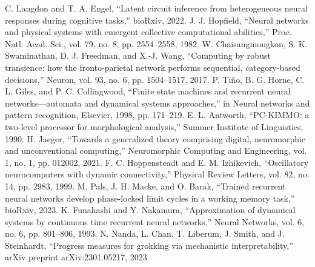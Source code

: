 \documentclass[conference]{IEEEtran}
\begin{document}
\begin{thebibliography}{00}
 C. Langdon and T. A. Engel, ``Latent circuit inference from heterogeneous neural responses during cognitive tasks,'' bioRxiv, 2022.
 J. J. Hopfield, ``Neural networks and physical systems with emergent collective computational abilities,'' Proc. Natl. Acad. Sci., vol. 79, no. 8, pp. 2554--2558, 1982.
 W. Chaisangmongkon, S. K. Swaminathan, D. J. Freedman, and X.-J. Wang, ``Computing by robust transience: how the fronto-parietal network performs sequential, category-based decisions,'' Neuron, vol. 93, no. 6, pp. 1504--1517, 2017.
 P. Ti\v{n}o, B. G. Horne, C. L. Giles, and P. C. Collingwood, ``Finite state machines and recurrent neural networks—automata and dynamical systems approaches,'' in Neural networks and pattern recognition, Elsevier, 1998, pp. 171--219.
 E. L. Antworth, ``PC-KIMMO: a two-level processor for morphological analysis,'' Summer Institute of Linguistics, 1990.
 H. Jaeger, ``Towards a generalized theory comprising digital, neuromorphic and unconventional computing,'' Neuromorphic Computing and Engineering, vol. 1, no. 1, pp. 012002, 2021.
 F. C. Hoppensteadt and E. M. Izhikevich, ``Oscillatory neurocomputers with dynamic connectivity,'' Physical Review Letters, vol. 82, no. 14, pp. 2983, 1999.
 M. Pals, J. H. Macke, and O. Barak, ``Trained recurrent neural networks develop phase-locked limit cycles in a working memory task,'' bioRxiv, 2023.
 K. Funahashi and Y. Nakamura, ``Approximation of dynamical systems by continuous time recurrent neural networks,'' Neural Networks, vol. 6, no. 6, pp. 801--806, 1993.
 N. Nanda, L. Chan, T. Liberum, J. Smith, and J. Steinhardt, ``Progress measures for grokking via mechanistic interpretability,'' arXiv preprint arXiv:2301.05217, 2023.
\end{thebibliography}
\vspace{12pt}
\end{document}
